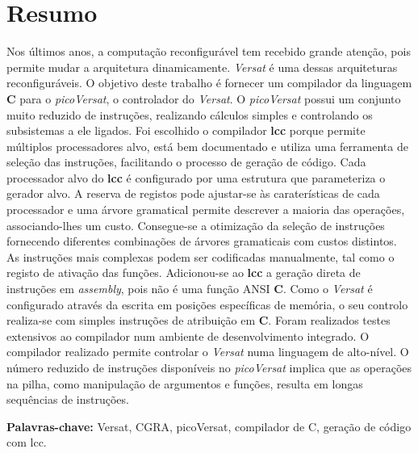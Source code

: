 
\section*{Resumo}


Nos últimos anos, a computação reconfigurável tem recebido grande atenção,
pois permite mudar a arquitetura dinamicamente.
{\it Versat} é uma dessas arquiteturas reconfiguráveis.
O objetivo deste trabalho é fornecer um compilador da linguagem
{\bf C} para o {\it picoVersat}, o controlador do {\it Versat}.
O {\it picoVersat} possui um conjunto muito reduzido de instruções,
realizando cálculos simples e controlando os subsistemas a ele ligados. %
Foi escolhido o compilador {\bf lcc} porque permite múltiplos processadores
alvo, está bem documentado e utiliza uma ferramenta de
seleção das instruções, facilitando o processo de geração de código. %
Cada processador alvo do {\bf lcc} é configurado por uma estrutura
que parameteriza o gerador alvo.
A reserva de registos pode ajustar-se às caraterísticas de cada processador
e uma árvore gramatical permite descrever a maioria das operações,
associando-lhes um custo. %
Consegue-se a otimização da seleção de instruções fornecendo diferentes
combinações de árvores gramaticais com custos distintos.
As instruções mais complexas podem ser codificadas manualmente, tal como o
registo de ativação das funções. %
Adicionou-se ao {\bf lcc} a geração direta de instruções em {\it assembly},
pois não é uma função {\sc ANSI} {\bf C}. %
Como o {\it Versat} é configurado através da escrita em posições específicas
de memória, o seu controlo realiza-se com simples instruções de
atribuição em {\bf C}. %
Foram realizados testes extensivos ao compilador num ambiente de
desenvolvimento integrado.
O compilador realizado permite controlar o {\it Versat} numa linguagem
de alto-nível.
O número reduzido de instruções disponíveis no {\it picoVersat} implica
que as operações na pilha, como manipulação de argumentos e funções,
resulta em longas sequências de instruções. %

\vfill

\textbf{\Large Palavras-chave:} Versat, CGRA, picoVersat, compilador de C, geração de código com lcc.

\cleardoublepage

